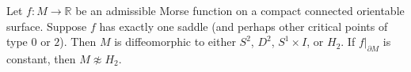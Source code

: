 Let $f: M \to \mathbb{R}$ be an admissible Morse function on a compact connected orientable surface. Suppose $f$ has exactly one saddle (and perhaps other critical points of type $0$ or $2$). Then $M$ is diffeomorphic to either $S^2$, $D^2$, $S^1 \times I$, or $H_2$. If $f|_{\partial M}$ is constant, then $M \not\approx H_2$.
